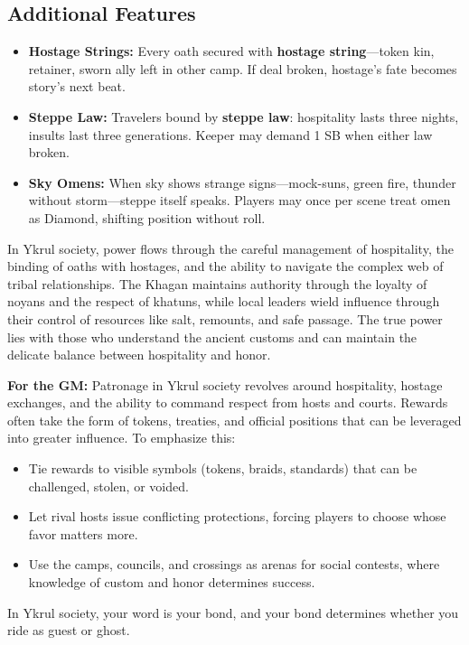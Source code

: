\subsection*{Additional Features}
\begin{itemize}
\item \textbf{Hostage Strings:} Every oath secured with \textbf{hostage string}---token kin, retainer, sworn ally left in other camp. If deal broken, hostage's fate becomes story's next beat.
\item \textbf{Steppe Law:} Travelers bound by \textbf{steppe law}: hospitality lasts three nights, insults last three generations. Keeper may demand 1 SB when either law broken.
\item \textbf{Sky Omens:} When sky shows strange signs---mock-suns, green fire, thunder without storm---steppe itself speaks. Players may once per scene treat omen as Diamond, shifting position without roll.
\end{itemize}

\begin{tcolorbox}[colback=black!3,colframe=black!40!white,title={Patronage \& Power}]
In Ykrul society, power flows through the careful management of hospitality, the binding of oaths with hostages, and the ability to navigate the complex web of tribal relationships. The Khagan maintains authority through the loyalty of noyans and the respect of khatuns, while local leaders wield influence through their control of resources like salt, remounts, and safe passage. The true power lies with those who understand the ancient customs and can maintain the delicate balance between hospitality and honor.

\textbf{For the GM:}  
Patronage in Ykrul society revolves around hospitality, hostage exchanges, and the ability to command respect from hosts and courts. Rewards often take the form of tokens, treaties, and official positions that can be leveraged into greater influence. To emphasize this:
\begin{itemize}
\item Tie rewards to visible symbols (tokens, braids, standards) that can be challenged, stolen, or voided.
\item Let rival hosts issue conflicting protections, forcing players to choose whose favor matters more.
\item Use the camps, councils, and crossings as arenas for social contests, where knowledge of custom and honor determines success.
\end{itemize}
In Ykrul society, your word is your bond, and your bond determines whether you ride as guest or ghost.
\end{tcolorbox}

